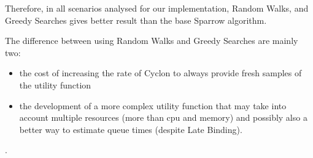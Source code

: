 \documentclass[conference]{IEEEtran}
\begin{document}
Therefore, in all scenarios analysed for our implementation, Random Walks, and Greedy Searches gives better result than the base Sparrow algorithm.

The difference between using Random Walks and Greedy Searches are mainly two:
\begin{itemize}
\item the cost of increasing the rate of Cyclon to always provide fresh samples of the utility function
\item the development of a more complex utility function that may take into account multiple resources (more than cpu and memory) and possibly also a better way to estimate queue times (despite Late Binding).
\end{itemize}

.
\end{document}
